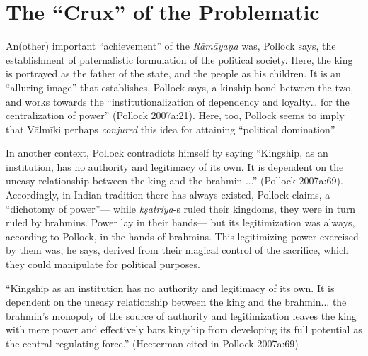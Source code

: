 \section{The “Crux” of the Problematic}\label{sec1.4}

An(other) important “achievement” of the {\sl Rāmāyaṇa} was, Pollock says, the establishment of paternalistic formulation of the political society. Here, the king is portrayed as the father of the state, and the people as his children. It is an “alluring image” that establishes, Pollock says, a kinship bond between the two, and works towards the “institutionalization of dependency and loyalty… for the centralization of power” (Pollock 2007a:21).  Here, too, Pollock seems to imply that Vālmīki perhaps {\sl conjured} this idea for attaining “political domination”. 

\newpage

In another context, Pollock contradicts himself by saying “Kingship, as an institution, has no authority and legitimacy of its own. It is dependent on the uneasy relationship between the king and the brahmin ...” (Pollock 2007a:69). Accordingly, in Indian tradition there has always existed, Pollock claims, a “dichotomy of power”--- while {\sl kṣatriya}-s ruled their kingdoms, they were in turn ruled by brahmins.  Power lay in their hands--- but its legitimization was always, according to Pollock, in the hands of brahmins. This legitimizing power exercised by them was, he says, derived from their magical control of the sacrifice, which they could manipulate for political purposes.

\begin{myquote}
“Kingship as an institution has no authority and legitimacy of its own. It is dependent on the uneasy relationship between the king and the brahmin... the brahmin’s monopoly of the source of authority and legitimization leaves the king with mere power and effectively bars kingship from developing its full potential as the central regulating force.” 	
\hfill (Heeterman cited in Pollock 2007a:69)
\end{myquote}

